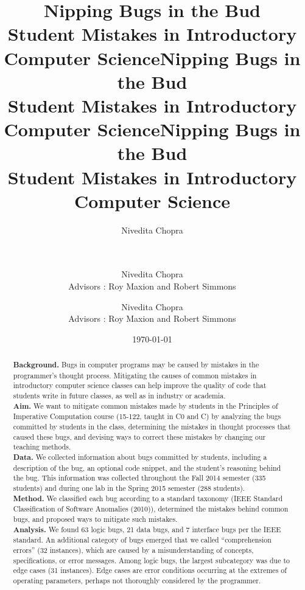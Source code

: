 \documentclass[11pt,letterpaper]{article}
\title{Nipping Bugs in the Bud\\ Student Mistakes in Introductory Computer Science}
\author{
\alignauthor
Nivedita Chopra\\
       \affaddr{Carnegie Mellon University}\\
       \affaddr{Pittsburgh, PA}\\
       \email{niveditc@andrew.cmu.edu}
\additionalauthors{Additional authors: Robert Simmons (Carnegie Mellon University,
email: {\texttt{rjsimmon@cs.cmu.edu}}) and Roy Maxion
(Carnegie Mellon University, email: {\texttt{maxion@cs.cmu.edu}}).}
}
\date{\today}
\title{\textbf{\Large{Nipping Bugs in the Bud\\ Student Mistakes in Introductory Computer Science}}}
\author{Nivedita Chopra\\ Advisors : Roy Maxion and Robert Simmons}
\date{}
\makeatletter
\newcommand{\acmtitle}[0]{
\title{Nipping Bugs in the Bud\\ Student Mistakes in Introductory Computer Science}
\numberofauthors{3}
\author{
\alignauthor
Nivedita Chopra\\
       \affaddr{Carnegie Mellon University}\\
       \affaddr{Pittsburgh, PA}\\
       \email{niveditc@andrew.cmu.edu}
\additionalauthors{Additional authors: Robert Simmons (Carnegie Mellon University,
email: {\texttt{rjsimmon@cs.cmu.edu}}) and Roy Maxion
(Carnegie Mellon University, email: {\texttt{maxion@cs.cmu.edu}}).}
}
\date{\today}
\maketitle
}
\newcommand{\thesistitle}[0]{
\title{\textbf{\Large{Nipping Bugs in the Bud\\ Student Mistakes in Introductory Computer Science}}}
\author{Nivedita Chopra\\ Advisors : Roy Maxion and Robert Simmons}
\date{}
\maketitle
\thispagestyle{empty}
\clearpage
}
\makeatother
\begin{document}
\thesistitle

\setcounter{page}{1}

\def\numlogicIEEE{66 }
\def\numdataIEEE{24 }
\def\numinterfaceIEEE{7 }
\def\numotherIEEE{26 }

\def\numlogic{63 }
\def\numdata{21 }
\def\numinterface{7 }
\def\numcomp{32 }
\def\numtotal{123 }
\def\numedge{31 }

\begin{abstract}
\textbf{Background.} Bugs in computer programs may be caused by mistakes in the programmer's thought process. Mitigating the causes of common mistakes in introductory computer science classes can help improve the quality of code that students write in future classes, as well as in industry or academia.\\

\textbf{Aim.} We want to mitigate common mistakes made by students in the Principles of Imperative Computation course (15-122, taught in C0 and C) by analyzing the bugs committed by students in the class, determining the mistakes in thought processes that caused these bugs, and devising ways to correct these mistakes by changing our teaching methods.\\

\textbf{Data.} We collected information about bugs committed by students, including a description of the bug, an optional code snippet, and the student's reasoning behind the bug. This information was collected throughout the Fall 2014 semester (335 students) and during one lab in the Spring 2015 semester (288 students).\\

\textbf{Method.} We classified each bug according to a standard taxonomy (IEEE Standard Classification of Software Anomalies (2010)), determined the mistakes behind common bugs, and proposed ways to mitigate such mistakes.\\

\textbf{Analysis.} We found \numlogic logic bugs, \numdata data bugs, and \numinterface interface bugs per the IEEE standard. An additional category of bugs emerged that we called ``comprehension errors'' (\numcomp instances), which are caused by a misunderstanding of concepts, specifications, or error messages. Among logic bugs, the largest subcategory was due to edge cases (\numedge instances). Edge cases are error conditions occurring at the extremes of operating parameters, perhaps not thoroughly considered by the programmer.\\


\end{abstract}
\end{document}
